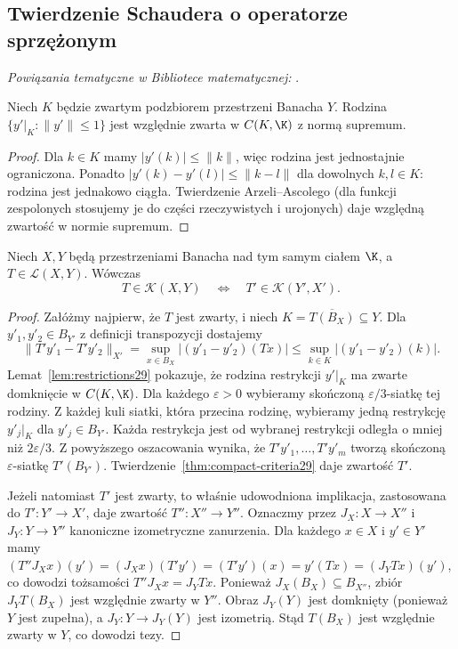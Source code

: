 \subsection{Twierdzenie Schaudera o operatorze sprzężonym}

\noindent\emph{Powiązania tematyczne w Bibliotece matematycznej:} .


\begin{lemat}
\label{lem:restrictions29}
Niech $K$ będzie zwartym podzbiorem przestrzeni Banacha $Y$.
Rodzina $\{y'|_K:\|y'\|\le1\}$ jest względnie zwarta
w $C(K,\K)$ z normą supremum.
\end{lemat}
\begin{proof}
Dla $k\in K$ mamy $|y'(k)|\le\|k\|$, więc rodzina jest
jednostajnie ograniczona. Ponadto
$|y'(k)-y'(l)|\le\|k-l\|$ dla dowolnych $k,l\in K$:
rodzina jest jednakowo ciągła. Twierdzenie Arzeli--Ascolego
(dla funkcji zespolonych stosujemy je do części rzeczywistych
i urojonych) daje względną zwartość w normie supremum.
\end{proof}

\begin{twierdzenie}
\label{thm:schauder-adjoint29}
Niech $X,Y$ będą przestrzeniami Banacha nad tym samym ciałem
$\K$, a $T\in\mathcal L(X,Y)$. Wówczas
\[
T\in\mathcal K(X,Y)\quad\Longleftrightarrow\quad
T'\in\mathcal K(Y',X').
\]
\end{twierdzenie}
\begin{proof}
Załóżmy najpierw, że $T$ jest zwarty, i niech
$K=\overline{T(B_X)}\subseteq Y$. Dla $y'_1,y'_2\in B_{Y'}$
z definicji transpozycji dostajemy
\[
\|T'y'_1-T'y'_2\|_{X'}
=\sup_{x\in B_X}|(y'_1-y'_2)(Tx)|
\le\sup_{k\in K}|(y'_1-y'_2)(k)|.
\]
Lemat~\ref{lem:restrictions29} pokazuje, że rodzina
restrykcji $y'|_K$ ma zwarte domknięcie w $C(K,\K)$.
Dla każdego $\varepsilon>0$ wybieramy skończoną
$\varepsilon/3$-siatkę tej rodziny. Z każdej kuli siatki,
która przecina rodzinę, wybieramy jedną restrykcję
$y'_j|_K$ dla $y'_j\in B_{Y'}$. Każda restrykcja jest
od wybranej restrykcji odległa o mniej niż $2\varepsilon/3$.
Z powyższego oszacowania wynika, że
$T'y'_1,\ldots,T'y'_m$ tworzą skończoną $\varepsilon$-siatkę
$T'(B_{Y'})$. Twierdzenie~\ref{thm:compact-criteria29}
daje zwartość $T'$.

Jeżeli natomiast $T'$ jest zwarty, to właśnie udowodniona
implikacja, zastosowana do $T':Y'\to X'$, daje zwartość
$T'':X''\to Y''$. Oznaczmy przez $J_X:X\to X''$ i
$J_Y:Y\to Y''$ kanoniczne izometryczne zanurzenia.
Dla każdego $x\in X$ i $y'\in Y'$ mamy
$(T''J_Xx)(y')=(J_Xx)(T'y')=(T'y')(x)=y'(Tx)=(J_YTx)(y')$,
co dowodzi tożsamości $T''J_Xx=J_YTx$. Ponieważ $J_X(B_X)\subseteq B_{X''}$,
zbiór $J_YT(B_X)$ jest względnie zwarty w $Y''$.
Obraz $J_Y(Y)$ jest domknięty (ponieważ $Y$ jest zupełna),
a $J_Y:Y\to J_Y(Y)$ jest izometrią. Stąd $T(B_X)$
jest względnie zwarty w $Y$, co dowodzi tezy.
\end{proof}


